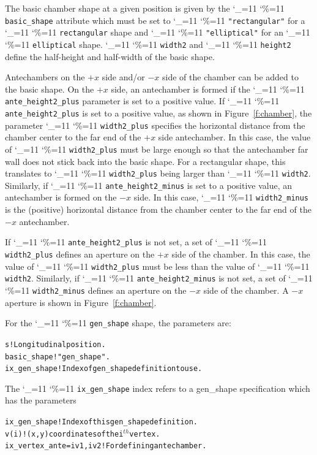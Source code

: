 \documentclass[11pt]{article}
\newcommand\ttcmd{\begingroup\catcode`\_=11 \catcode`\%=11 \dottcmd}
\newcommand\dottcmd[1]{\texttt{#1}\endgroup}
\newcommand{\fig}[1]{Figure~\ref{#1}}
\newcommand{\vn}{\ttcmd}
\newcommand{\Th}{$^{th}$\xspace}
\newlength{\ExBeg}
\newlength{\ExEnd}
\newenvironment{example}
  {\vspace{\ExBeg} \begin{alltt}}
  {\end{alltt} \vspace{\ExEnd}}
\begin{document}
The basic chamber shape at a given position is given by the
\vn{basic_shape} attribute which must be set to 
\vn{"rectangular"} for a \vn{rectangular} shape and \vn{"elliptical"}
for an \vn{elliptical} shape. \vn{width2} and \vn{height2}
define the half-height and half-width of the basic shape.

Antechambers on the $+x$ side and/or $-x$ side of the chamber can be
added to the basic shape. On the $+x$ side, an antechamber is formed
if the \vn{ante_height2_plus} parameter is set to a positive value. If
\vn{ante_height2_plus} is set to a positive value, as shown in
\fig{f:chamber}, the parameter \vn{width2_plus} specifies the
horizontal distance from the chamber center to the far end of the $+x$
side antechamber. In this case, the value of \vn{width2_plus} must be
large enough so that the antechamber far wall does not stick back into
the basic shape. For a rectangular shape, this translates to
\vn{width2_plus} being larger than \vn{width2}. Similarly, if
\vn{ante_height2_minus} is set to a positive value, an antechamber is
formed on the $-x$ side.  In this case, \vn{width2_minus} is the
(positive) horizontal distance from the chamber center to the far end
of the $-x$ antechamber.

If \vn{ante_height2_plus} is not set, a set of \vn{width2_plus}
defines an aperture on the $+x$ side of the chamber. In this case, the
value of \vn{width2_plus} must be less than the value of
\vn{width2}. Similarly, if \vn{ante_height2_minus} is not set, a set of
\vn{width2_minus} defines an aperture on the $-x$ side of the chamber.
A $-x$ aperture is shown in \fig{f:chamber}.

For the \vn{gen_shape} shape, the parameters are:
\begin{example}
  s                   ! Longitudinal position.
  basic_shape         ! "gen_shape".
  ix_gen_shape        ! Index of gen_shape definition to use.
\end{example}
The \vn{ix_gen_shape} index refers to a gen_shape
specification which has the parameters
\begin{example}
  ix_gen_shape        ! Index of this gen_shape definition.
  v(i)                ! (x, y) coordinates of the i\Th vertex.
  ix_vertex_ante = iv1, iv2  ! For defining antechamber.
\end{example}
\end{document}
